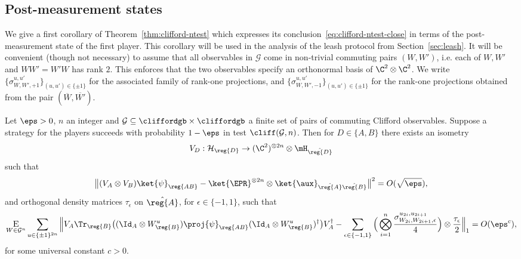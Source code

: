 \subsection{Post-measurement states}

We give a first corollary of Theorem~\ref{thm:clifford-ntest} which expresses its conclusion~\eqref{eq:clifford-ntest-close} in terms of the post-measurement state of the first player. This corollary will be used in the analysis of the leash protocol from Section~\ref{sec:leash}. It will be convenient (though not necessary) to assume that all observables in $\mathcal{G}$ come in non-trivial commuting pairs $(W,W')$, i.e. each of $W, W'$ and $WW'=W'W$ has rank $2$. This enforces that the two observables specify an orthonormal basis of $\C^2\otimes \C^2$. We write $\{\sigma_{W,W',+1}^{u,u'}\}_{(u,u')\in\{\pm 1\}}$ for the associated family of rank-one projections, and $\{\sigma_{W,W',-1}^{u,u'}\}_{(u,u')\in\{\pm 1\}}$ for the rank-one projections obtained from the pair $(\overline{W},\overline{W'})$. 

\begin{corollary}\label{cor:clifford-rigid}
Let $\eps>0$, $n$ an integer and $\mathcal{G} \subseteq \cliffordgb\times\cliffordgb$ a finite set of pairs of commuting Clifford observables. Suppose a strategy for the players succeeds with probability $1-\eps$ in test $\cliff(\mathcal{G},n)$. Then for $D\in\{A,B\}$ there exists an isometry 
$$V_D: \mathcal{H}_\reg{D} \to (\C^2)^{\otimes 2n} \otimes {\mH}_{\hat{\reg{D}}}$$
such that
$$ \big\| (V_A \otimes V_B) \ket{\psi}_{\reg{AB}}  - \ket{\EPR}^{\otimes 2n} \otimes \ket{\aux}_{\hat{\reg{A}}\hat{\reg{B}}} \big\|^2 = O(\sqrt{\eps}),$$
and orthogonal density matrices $\tau_\epsilon$ on $\hat{\reg{A}}$, for $\epsilon\in\{-1,1\}$, such that
$$ \mathop{\textsc{E}}_{W\in\mathcal{G}^n} \sum_{u\in\{\pm 1\}^{2n}} \Big\| V_A \Tr_{\reg{B}}\big((\Id_A \otimes W_{\reg{B}}^u) \proj{\psi}_{\reg{AB}} (\Id_A \otimes W_{\reg{B}}^u)^\dagger\big) V_A^\dagger - \sum_{\epsilon\in\{-1,1\}} \Big( \bigotimes_{i=1}^n \frac{\sigma_{W_{2i},W_{2i+1},\epsilon}^{u_{2i},u_{2i+1}}}{4}\Big)\otimes \frac{\tau_\epsilon}{2}   \Big\|_1 = O(\eps^c),$$
for some universal constant $c>0$. 
\end{corollary}

